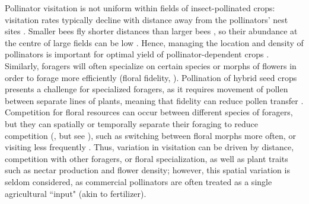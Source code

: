 \documentclass[12pt]{article} %
\begin{document}
Pollinator visitation is not uniform within fields of insect-pollinated crops: visitation rates typically decline with distance away from the pollinators' nest sites \citep{Ricketts2008}.
Smaller bees fly shorter distances than larger bees \citep{greenleaf2007,zurbuchen2010}, so their abundance at the centre of large fields can be low \citep{isaacs2010}. 
Hence, managing the location and density of pollinators is important for optimal yield of pollinator-dependent crops \citep{fries1983,cresswell2004b}.
Similarly, foragers will often specialize on certain species or morphs of flowers in order to forage more efficiently (floral fidelity, \citealp{heinrich1976b, goulson1997}). 
Pollination of hybrid seed crops presents a challenge for specialized foragers, as it requires movement of pollen between separate lines of plants, meaning that fidelity can reduce pollen transfer \citep{gaffney2019,waytes2022}.
Competition for floral resources can occur between different species of foragers, but they can spatially or temporally separate their foraging to reduce competition (\citealp{schaffer1979,thomson1987}, but see \citealp{steffan2000}), such as switching between floral morphs more often, or visiting less frequently \citep{heinrich1979, greenleaf2006}.
Thus, variation in visitation can be driven by distance, competition with other foragers, or floral specialization, as well as plant traits such as nectar production and flower density; however, this spatial variation is seldom considered, as commercial pollinators are often treated as a single agricultural ``input" (akin to fertilizer).
\end{document}
